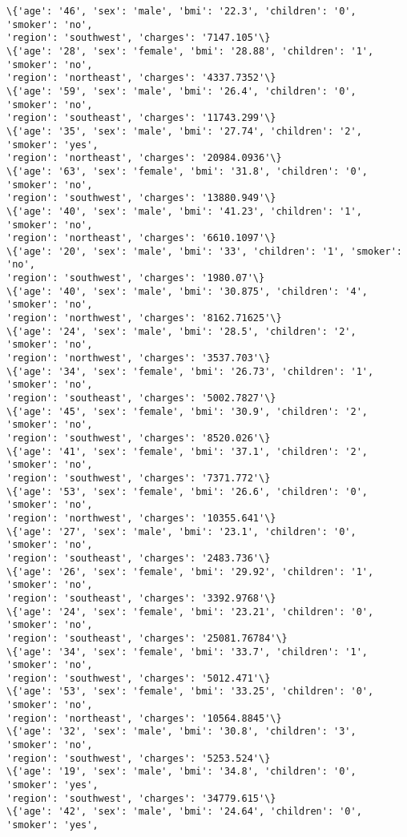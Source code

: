 \documentclass[11pt]{article}
\begin{document}
\begin{Verbatim}[commandchars=\\\{\}]
\{'age': '46', 'sex': 'male', 'bmi': '22.3', 'children': '0', 'smoker': 'no',
'region': 'southwest', 'charges': '7147.105'\}
\{'age': '28', 'sex': 'female', 'bmi': '28.88', 'children': '1', 'smoker': 'no',
'region': 'northeast', 'charges': '4337.7352'\}
\{'age': '59', 'sex': 'male', 'bmi': '26.4', 'children': '0', 'smoker': 'no',
'region': 'southeast', 'charges': '11743.299'\}
\{'age': '35', 'sex': 'male', 'bmi': '27.74', 'children': '2', 'smoker': 'yes',
'region': 'northeast', 'charges': '20984.0936'\}
\{'age': '63', 'sex': 'female', 'bmi': '31.8', 'children': '0', 'smoker': 'no',
'region': 'southwest', 'charges': '13880.949'\}
\{'age': '40', 'sex': 'male', 'bmi': '41.23', 'children': '1', 'smoker': 'no',
'region': 'northeast', 'charges': '6610.1097'\}
\{'age': '20', 'sex': 'male', 'bmi': '33', 'children': '1', 'smoker': 'no',
'region': 'southwest', 'charges': '1980.07'\}
\{'age': '40', 'sex': 'male', 'bmi': '30.875', 'children': '4', 'smoker': 'no',
'region': 'northwest', 'charges': '8162.71625'\}
\{'age': '24', 'sex': 'male', 'bmi': '28.5', 'children': '2', 'smoker': 'no',
'region': 'northwest', 'charges': '3537.703'\}
\{'age': '34', 'sex': 'female', 'bmi': '26.73', 'children': '1', 'smoker': 'no',
'region': 'southeast', 'charges': '5002.7827'\}
\{'age': '45', 'sex': 'female', 'bmi': '30.9', 'children': '2', 'smoker': 'no',
'region': 'southwest', 'charges': '8520.026'\}
\{'age': '41', 'sex': 'female', 'bmi': '37.1', 'children': '2', 'smoker': 'no',
'region': 'southwest', 'charges': '7371.772'\}
\{'age': '53', 'sex': 'female', 'bmi': '26.6', 'children': '0', 'smoker': 'no',
'region': 'northwest', 'charges': '10355.641'\}
\{'age': '27', 'sex': 'male', 'bmi': '23.1', 'children': '0', 'smoker': 'no',
'region': 'southeast', 'charges': '2483.736'\}
\{'age': '26', 'sex': 'female', 'bmi': '29.92', 'children': '1', 'smoker': 'no',
'region': 'southeast', 'charges': '3392.9768'\}
\{'age': '24', 'sex': 'female', 'bmi': '23.21', 'children': '0', 'smoker': 'no',
'region': 'southeast', 'charges': '25081.76784'\}
\{'age': '34', 'sex': 'female', 'bmi': '33.7', 'children': '1', 'smoker': 'no',
'region': 'southwest', 'charges': '5012.471'\}
\{'age': '53', 'sex': 'female', 'bmi': '33.25', 'children': '0', 'smoker': 'no',
'region': 'northeast', 'charges': '10564.8845'\}
\{'age': '32', 'sex': 'male', 'bmi': '30.8', 'children': '3', 'smoker': 'no',
'region': 'southwest', 'charges': '5253.524'\}
\{'age': '19', 'sex': 'male', 'bmi': '34.8', 'children': '0', 'smoker': 'yes',
'region': 'southwest', 'charges': '34779.615'\}
\{'age': '42', 'sex': 'male', 'bmi': '24.64', 'children': '0', 'smoker': 'yes',

\end{Verbatim}
\end{document}
